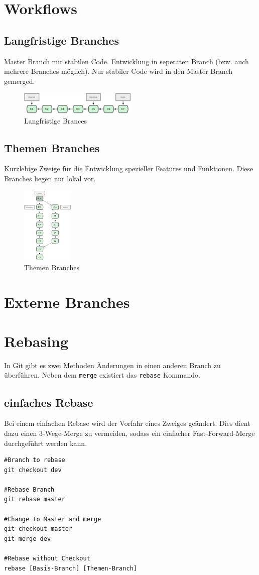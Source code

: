 \section{Workflows}
\subsection{Langfristige Branches}
Master Branch mit stabilen Code. Entwicklung in seperaten Branch (bzw. auch mehrere Branches möglich). Nur stabiler Code wird in den Master Branch gemerged.
\begin{figure}[ht]
	\centering
		\includegraphics[width=0.5\textwidth]{img/longterm.png}
	\caption{Langfristige Brances}
\end{figure}
\subsection{Themen Branches}
Kurzlebige Zweige für die Entwicklung spezieller Features und Funktionen. Diese Branches liegen nur lokal vor.
\begin{figure}[ht]
	\centering
		\includegraphics[width=0.22\textwidth, angle=90]{img/thema.png}
	\caption{Themen Branches}
\end{figure}
\section{Externe Branches}
\section{Rebasing}
In Git gibt es zwei Methoden Änderungen in einen anderen Branch zu überführen. Neben dem \texttt{merge} existiert das \texttt{rebase} Kommando.
\subsection{einfaches Rebase}
Bei einem einfachen Rebase wird der Vorfahr eines Zweiges geändert. Dies dient dazu einen 3-Wege-Merge zu vermeiden, sodass ein einfacher Fast-Forward-Merge durchgeführt werden kann.
\begin{lstlisting}[caption={Einfaches Rebase},captionpos=b]
#Branch to rebase
git checkout dev

#Rebase Branch
git rebase master

#Change to Master and merge
git checkout master
git merge dev

#Rebase without Checkout
rebase [Basis-Branch] [Themen-Branch]
\end{lstlisting}
